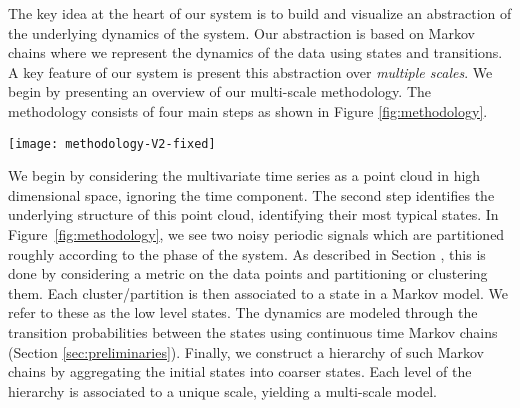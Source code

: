 \iffalse
\begin{itemize}
	\item Initial state construction (State Identification)
	\item Aggregation (State Aggregation)
	\item Transition probabililties (Modeling transitions)
\end{itemize}
\fi

The key idea at the heart of our system is to build and visualize an abstraction of the underlying 
dynamics of the system. Our abstraction is based on Markov chains where we represent the dynamics of the data using states and transitions. A key feature of our system is  present this abstraction over \emph{multiple scales}. 
%
%
We begin by presenting an overview
of our multi-scale methodology. The methodology consists of four main steps as shown in Figure \ref{fig:methodology}.
\begin{figure*}[h!]
	\centering
	\texttt{[image: methodology-V2-fixed]}
	\caption{Overview of the proposed three-step methodology.}
	\label{fig:methodology}
\end{figure*}

We begin by considering the multivariate time series as a point cloud in high dimensional space, ignoring the time component. The second step identifies the underlying structure of this point cloud, identifying their most typical states. In Figure~\ref{fig:methodology}, we see two noisy periodic signals which are partitioned roughly according to the phase of the system. As described in Section , this is done by considering a metric on the data points and partitioning or clustering them. Each cluster/partition is then associated to a state in a Markov model. We refer to these as the low level states. The 
 dynamics are modeled through the transition probabilities between the states using continuous time Markov chains (Section \ref{sec:preliminaries}). Finally, we construct a hierarchy of such Markov chains by aggregating the initial states into coarser states. Each level of the hierarchy is associated to a unique scale, yielding a multi-scale model.

